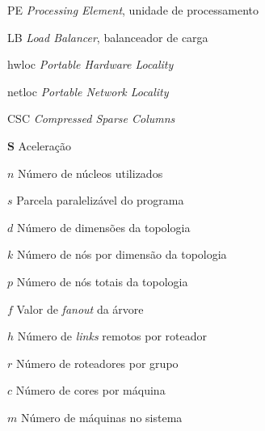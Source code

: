\documentclass[
	12pt,				%
	openright,			%
	twoside,			%
	a4paper,			%
	english,			%
	brazil,				%
	]{abntex2}
\newcommand{\links}{\textit{links}\xspace}
\begin{document}
 

\listoffigures*
\cleardoublepage

\listoftables*
\cleardoublepage

\begin{siglas}
  \item[PE] \textit{Processing Element}, unidade de processamento
  \item[LB] \textit{Load Balancer}, balanceador de carga
  \item[hwloc] \textit{Portable Hardware Locality}
  \item[netloc] \textit{Portable Network Locality}
  \item[CSC] \textit{Compressed Sparse Columns}
\end{siglas}

\begin{simbolos}
    \item[$\textbf{S}$] Aceleração
    \item[$n$] Número de núcleos utilizados
    \item[$s$] Parcela paralelizável do programa
    \item[$d$] Número de dimensões da topologia
    \item[$k$] Número de nós por dimensão da topologia
    \item[$p$] Número de nós totais da topologia
    \item[$f$] Valor de \textit{fanout} da árvore
    \item[$h$] Número de \links remotos por roteador
    \item[$r$] Número de roteadores por grupo
    \item[$c$] Número de cores por máquina
    \item[$m$] Número de máquinas no sistema
\end{simbolos}
\end{document}
